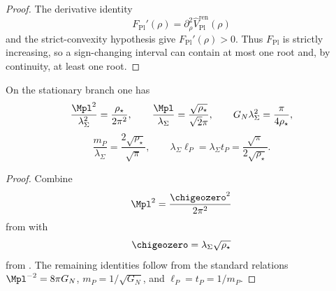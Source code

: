 \begin{proof}
The derivative identity
\[
F_{\mathrm{Pl}}'(\rho)=\partial_\rho^2\widehat V_{\mathrm{Pl}}^{\mathrm{ren}}(\rho)
\]
and the strict-convexity hypothesis give $F_{\mathrm{Pl}}'(\rho)>0$. Thus $F_{\mathrm{Pl}}$ is
strictly increasing, so a sign-changing interval can contain at most one root and, by continuity, at
least one root.
\end{proof}

\begin{corollary}
\label{cor:planck_normalization_stationary_branch}
On the stationary branch one has
\[
\frac{\Mpl^2}{\lambda_\Sigma^2}
=
\frac{\rho_\star}{2\pi^2},
\qquad
\frac{\Mpl}{\lambda_\Sigma}
=
\frac{\sqrt{\rho_\star}}{\sqrt2\pi},
\qquad
G_N\lambda_\Sigma^2
=
\frac{\pi}{4\rho_\star},
\]
\[
\frac{m_P}{\lambda_\Sigma}
=
\frac{2\sqrt{\rho_\star}}{\sqrt\pi},
\qquad
\lambda_\Sigma\ell_P=\lambda_\Sigma t_P
=
\frac{\sqrt\pi}{2\sqrt{\rho_\star}}.
\]
\end{corollary}

\begin{proof}
Combine
\[
\Mpl^2=\frac{\chigeozero^2}{2\pi^2}
\]
from  with
\[
\chigeozero=\lambda_\Sigma\sqrt{\rho_\star}
\]
from . The remaining identities follow from the standard
relations $\Mpl^{-2}=8\pi G_N$, $m_P=1/\sqrt{G_N}$, and $\ell_P=t_P=1/m_P$.
\end{proof}
